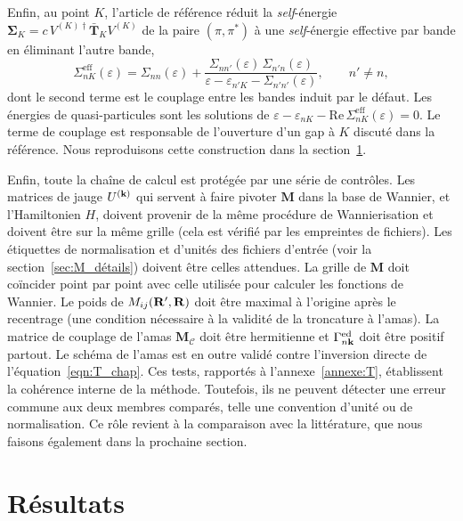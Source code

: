 Enfin, au point $K$, l'article de référence réduit la \textit{self}-énergie $\bm\Sigma_K = c\, V^{(K)\dag}\bar{\bm T}_K V^{(K)}$ de la paire $(\pi, \pi^*)$ à une \textit{self}-énergie effective par bande en éliminant l'autre bande,
\begin{equation}
    \Sigma^\text{eff}_{nK}(\varepsilon) = \Sigma_{nn}(\varepsilon) + \frac{\Sigma_{nn'}(\varepsilon)\,\Sigma_{n'n}(\varepsilon)}{\varepsilon-\varepsilon_{n'K}-\Sigma_{n'n'}(\varepsilon)},\qquad n'\neq n,\label{eqn:sigma_eff}
\end{equation}
dont le second terme est le couplage entre les bandes induit par le défaut. Les énergies de quasi-particules sont les solutions de $\varepsilon-\varepsilon_{nK}-\mathrm{Re}\,\Sigma^\text{eff}_{nK}(\varepsilon)=0$. Le terme de couplage est responsable de l'ouverture d'un gap à $K$ discuté dans la référence. Nous reproduisons cette construction dans la section~\ref{sec:T_results}.

\bigskip
{}

Enfin, toute la chaîne de calcul est protégée par une série de contrôles. Les matrices de jauge $U^{(\mathbf{k})}$ qui servent à faire pivoter $\bm M$ dans la base de Wannier, et l'Hamiltonien $H$, doivent provenir de la même procédure de Wannierisation et doivent être sur la même grille (cela est vérifié par les empreintes de fichiers). Les étiquettes de normalisation et d'unités des fichiers d'entrée (voir la section~\ref{sec:M_détails}) doivent être celles attendues. La grille de $\bm M$ doit coïncider point par point avec celle utilisée pour calculer les fonctions de Wannier. Le poids de $M_{ij}(\mathbf{R}',\mathbf{R})$ doit être maximal à l'origine après le recentrage (une condition nécessaire à la validité de la troncature à l'amas). La matrice de couplage de l'amas $\bm M_\mathcal{C}$ doit être hermitienne et $\Gamma_{n\mathbf{k}}^\text{ed}$ doit être positif partout. Le schéma de l'amas est en outre validé contre l'inversion directe de l'équation~\eqref{eqn:T_chap}. Ces tests, rapportés à l'annexe~\ref{annexe:T}, établissent la cohérence interne de la méthode. Toutefois, ils ne peuvent détecter une erreur commune aux deux membres comparés, telle une convention d'unité ou de normalisation. Ce rôle revient à la comparaison avec la littérature, que nous faisons également dans la prochaine section.

\section{Résultats}\label{sec:T_results}

